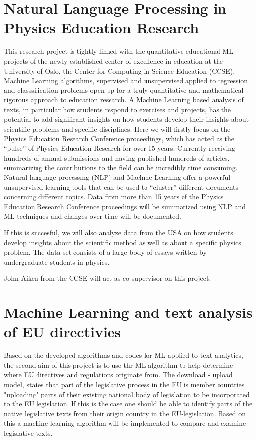 \documentclass{article}
\begin{document}
\section{Natural Language Processing in Physics Education Research}

This research project is tightly linked with the quantitative
educational ML projects of the newly established center of excellence
in education at the University of Oslo, the Center for Computing in
Science Education (CCSE). Machine Learning algorithms, supervised and
unsupervised applied to regression and classsification problems open
up for a truly quantitative and mathematical rigorous approach to
education research.  A Machine Learning based analysis of texts, in
particular how students respond to exercises and projects, has the
potential to add significant insights on how students develop their
insights about scientific problems and specific disciplines. Here we
will firstly focus on the Physics Education Research Conference
proceedings, which has acted as the “pulse” of Physics Education
Research for over 15 years. Currently receiving hundreds of annual
submissions and having published hundreds of articles, summarizing the
contributions to the field can be incredibly time consuming. Natural
language processing (NLP) and Machine Learning offer a powerful
unsupervised learning tools that can be used to “cluster” different
documents concerning different topics. Data from more than 15 years of
the Physics Education Research Conference proceedings will be
summarized using NLP and ML techniques and changes over time will be
documented.

If this is succesful, we will also analyze data from the USA on how
students develop insights about the scientific method as well as about
a specific physics problem. The data set consists of a large body of
essays written by undergraduate students in physics.

John Aiken from the CCSE will act as co-supervisor on this project.

\section{Machine Learning and text analysis of EU directivies}

Based on the developed algorithms and codes for ML applied to text
analytics, the second aim of this project is to use thr ML algorithm
to help determine where EU directives and regulations originate
from. The download - upload model, states that part of the legislative
process in the EU is member countries "uploading" parts of their
existing national body of legislation to be incorporated to the EU
legislation.  If this is the case one should be able to identify parts
of the native legislative texts from their origin country in the
EU-legislation. Based on this a machine learning algorithm will be
implemented to compare and examine legislative texts.
\end{document}
